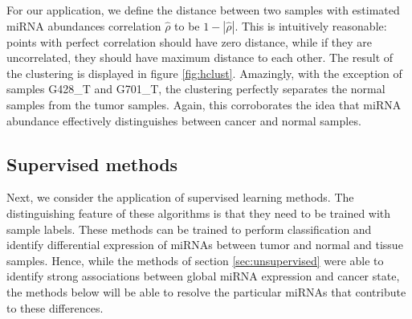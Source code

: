 \documentclass[12pt,english]{article}\usepackage{graphicx, color}
\makeatletter
\def\maxwidth{ %
  \ifdim\Gin@nat@width>\linewidth
    \linewidth
  \else
    \Gin@nat@width
  \fi
}
\newcommand{\hlfunctioncall}[1]{\textcolor[rgb]{0.501960784313725,0,0.329411764705882}{\textbf{#1}}}%
\newcommand{\hlstring}[1]{\textcolor[rgb]{0.6,0.6,1}{#1}}%
\newenvironment{kframe}{%
 \def\at@end@of@kframe{}%
 \ifinner\ifhmode%
  \def\at@end@of@kframe{\end{minipage}}%
  \begin{minipage}{\columnwidth}%
 \fi\fi%
 \def\FrameCommand##1{\hskip\@totalleftmargin \hskip-\fboxsep
 \colorbox{shadecolor}{##1}\hskip-\fboxsep
     \hskip-\linewidth \hskip-\@totalleftmargin \hskip\columnwidth}%
 \MakeFramed {\advance\hsize-\width
   \@totalleftmargin\z@ \linewidth\hsize
   \@setminipage}}%
 {\par\unskip\endMakeFramed%
 \at@end@of@kframe}
\newenvironment{knitrout}{}{} %
\numberwithin{equation}{section}
\numberwithin{figure}{section}
\theoremstyle{plain}
\theoremstyle{remark}
\makeatother
\begin{document}
For our application, we define the distance between two samples
with estimated miRNA abundances correlation $\hat{\rho}$ to be $1 -
\left|\hat{\rho}\right|$. This is intuitively reasonable: points with
perfect correlation should have zero distance, while
if they are uncorrelated, they should have maximum distance to each
other. The result of the clustering is displayed in figure
\ref{fig:hclust}. Amazingly, with the exception of samples
G428\_T and G701\_T, the clustering perfectly separates the normal
samples from the tumor samples. Again, this corroborates the idea that
miRNA abundance effectively distinguishes between cancer and normal
samples.

\subsection{Supervised methods}
\label{sec:supervised_methods}

Next, we consider the application of supervised learning methods. The
distinguishing feature of these algorithms is that they need to
be trained with sample labels. These methods can be trained to perform
classification and identify differential expression of miRNAs between
tumor and normal and tissue samples. Hence, while the methods of
section \ref{sec:unsupervised} were able to identify strong
associations between global miRNA expression and cancer state, the
methods below will be able to resolve the particular miRNAs that
contribute to these differences.
\end{document}
